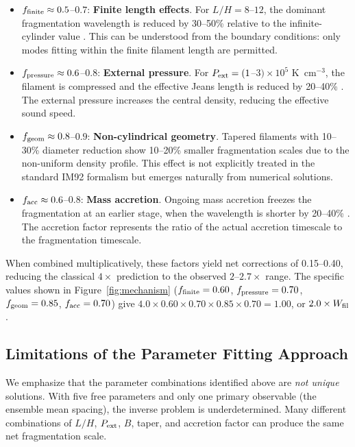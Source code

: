 \documentclass[11pt,a4paper]{article}
\begin{document}
\begin{itemize}
    \item $f_{\rm finite} \approx 0.5$--$0.7$: \textbf{Finite length effects}. For $L/H = 8$--$12$, the dominant fragmentation wavelength is reduced by 30--50\% relative to the infinite-cylinder value \citep{Inutsuka1997}. This can be understood from the boundary conditions: only modes fitting within the finite filament length are permitted.

    \item $f_{\rm pressure} \approx 0.6$--$0.8$: \textbf{External pressure}. For $P_{\rm ext} = (1$--$3) \times 10^5$ K~cm$^{-3}$, the filament is compressed and the effective Jeans length is reduced by 20--40\% \citep{Fischera2012}. The external pressure increases the central density, reducing the effective sound speed.

    \item $f_{\rm geom} \approx 0.8$--$0.9$: \textbf{Non-cylindrical geometry}. Tapered filaments with 10--30\% diameter reduction show 10--20\% smaller fragmentation scales due to the non-uniform density profile. This effect is not explicitly treated in the standard IM92 formalism but emerges naturally from numerical solutions.

    \item $f_{\rm acc} \approx 0.6$--$0.8$: \textbf{Mass accretion}. Ongoing mass accretion freezes the fragmentation at an earlier stage, when the wavelength is shorter by 20--40\% \citep{Heitsch2013}. The accretion factor represents the ratio of the actual accretion timescale to the fragmentation timescale.
\end{itemize}

When combined multiplicatively, these factors yield net corrections of 0.15--0.40, reducing the classical $4\times$ prediction to the observed $2$--$2.7\times$ range. The specific values shown in Figure~\ref{fig:mechanism} ($f_{\rm finite} = 0.60$, $f_{\rm pressure} = 0.70$, $f_{\rm geom} = 0.85$, $f_{\rm acc} = 0.70$) give $4.0 \times 0.60 \times 0.70 \times 0.85 \times 0.70 = 1.00$, or $2.0\times W_{\rm fil}$.

\subsection{Limitations of the Parameter Fitting Approach}

We emphasize that the parameter combinations identified above are \textit{not unique} solutions. With five free parameters and only one primary observable (the ensemble mean spacing), the inverse problem is underdetermined. Many different combinations of $L/H$, $P_{\rm ext}$, $B$, taper, and accretion factor can produce the same net fragmentation scale.
\end{document}
